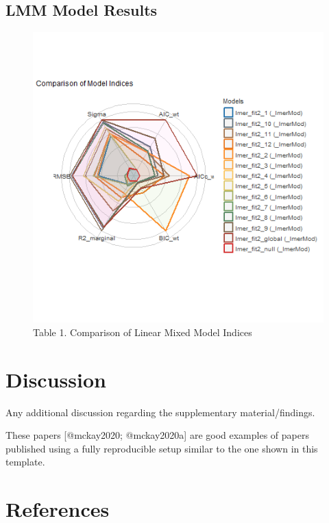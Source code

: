\documentclass[
  letterpaper,
  DIV=11,
  numbers=noendperiod]{scrartcl}
\begin{document}
\hypertarget{lmm-model-results}{%
\subsection{LMM Model Results}\label{lmm-model-results}}

\begin{figure}

{\centering \includegraphics{Images/lmer_indices.tiff}

}

\caption{Table 1. Comparison of Linear Mixed Model Indices}

\end{figure}

\newpage{}

\hypertarget{discussion}{%
\section{Discussion}\label{discussion}}

Any additional discussion regarding the supplementary material/findings.

These papers {[}@mckay2020; @mckay2020a{]} are good examples of papers
published using a fully reproducible setup similar to the one shown in
this template.

\newpage{}

\hypertarget{references}{%
\section{References}\label{references}}
\end{document}
